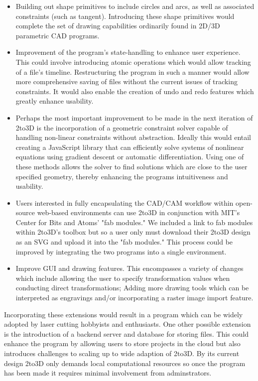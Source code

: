 \begin{itemize}
  \item Building out shape primitives to include circles and arcs, as well as associated constraints (such as tangent). Introducing these shape primitives would complete the set of drawing capabilities ordinarily found in 2D/3D parametric CAD programs.

  \item Improvement of the program's state-handling to enhance user experience. This could involve introducing atomic operations which would allow tracking of a file's timeline. Restructuring the program in such a manner would allow more comprehensive saving of files without the current issues of tracking constraints. It would also enable the creation of undo and redo features which greatly enhance usability.

  \item Perhaps the most important improvement to be made in the next iteration of 2to3D is the incorporation of a geometric constraint solver capable of handling non-linear constraints without abstraction. Ideally this would entail creating a JavaScript library that can efficiently solve systems of nonlinear equations using gradient descent or automatic differentiation. Using one of these methods allows the solver to find solutions which are close to the user specified geometry, thereby enhancing the programs intuitiveness and usability.

  \item Users interested in fully encapsulating the CAD/CAM workflow within open-source web-based environments can use 2to3D in conjunction with MIT's Center for Bits and Atoms' "fab modules." We included a link to fab modules within 2to3D's toolbox but so a user only must download their 2to3D design as an SVG and upload it into the "fab modules." This process could be improved by integrating the two programs into a single environment.
  
  \item Improve GUI and drawing features. This encompasses a variety of changes which include allowing the user to specify transformation values when conducting direct transformations; Adding more drawing tools which can be interpreted as engravings and/or incorporating a raster image import feature.
\end{itemize}

Incorporating these extensions would result in a program which can be widely adopted by laser cutting hobbyists and enthusiasts. One other possible extension is the introduction of a backend server and database for storing files. This could enhance the program by allowing users to store projects in the cloud but also introduces challenges to scaling up to wide adaption of 2to3D. By its current design 2to3D only demands local computational resources so once the program has been made it requires minimal involvement from adminstrators. 


